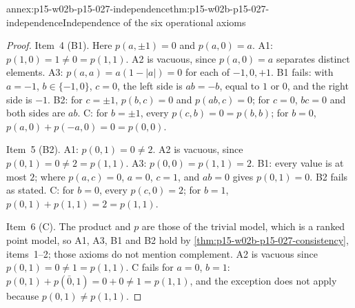 \begin{annexitem}{annex:p15-w02b-p15-027-independence}{thm:p15-w02b-p15-027-independence}{Independence of the six operational axioms}
\begin{proof}
Item~4 (B1). Here \(p(a,\pm1)=0\) and \(p(a,0)=a\). A1:
\(p(1,0)=1\neq0=p(1,1)\). A2 is vacuous, since \(p(a,0)=a\) separates
distinct elements. A3: \(p(a,a)=a(1-|a|)=0\) for each of \(-1,0,+1\). B1
fails: with \(a=-1\), \(b\in\{-1,0\}\), \(c=0\), the left side is
\(ab=-b\), equal to \(1\) or \(0\), and the right side is \(-1\). B2: for
\(c=\pm1\), \(p(b,c)=0\) and \(p(ab,c)=0\); for \(c=0\), \(bc=0\) and both
sides are \(ab\). C: for \(b=\pm1\), every \(p(c,b)=0=p(b,b)\); for
\(b=0\), \(p(a,0)+p(-a,0)=0=p(0,0)\).

Item~5 (B2). A1: \(p(0,1)=0\neq2\). A2 is vacuous, since
\(p(0,1)=0\neq2=p(1,1)\). A3: \(p(0,0)=p(1,1)=2\). B1: every value is at
most \(2\); where \(p(a,c)=0\), \(a=0\), \(c=1\), and \(ab=0\) gives
\(p(0,1)=0\). B2 fails as stated. C: for \(b=0\), every \(p(c,0)=2\); for
\(b=1\), \(p(0,1)+p(1,1)=2=p(1,1)\).

Item~6 (C). The product and \(p\) are those of the trivial model, which
is a ranked point model, so A1, A3, B1 and B2 hold by
\cref{thm:p15-w02b-p15-027-consistency}, items~1--2; those axioms do not
mention complement. A2 is vacuous since \(p(0,1)=0\neq1=p(1,1)\). C fails
for \(a=0\), \(b=1\): \(p(0,1)+p(\bar0,1)=0+0\neq1=p(1,1)\), and the
exception does not apply because \(p(0,1)\neq p(1,1)\).
\end{proof}
\end{annexitem}
